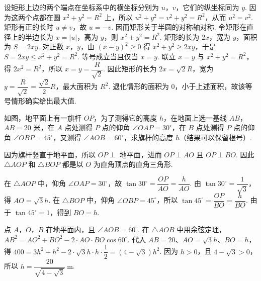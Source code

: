 \begin{solution}
设矩形上边的两个端点在坐标系中的横坐标分别为 \(u\)，\(v\)，它们的纵坐标同为 \(y\). 因为这两个点都在圆 \(x^2+y^2=R^2\) 上，所以 \(u^2+y^2=v^2+y^2=R^2\)，从而 \(u^2=v^2\). 矩形有正的长时 \(u\ne v\)，故 \(u=-v\). 因而矩形关于半圆的对称轴对称. 令矩形在直径上的半边长为 \(x=|u|\)，高为 \(y\)，则 \(x^2+y^2=R^2\). 矩形的长为 \(2x\)，宽为 \(y\)，面积为 \(S=2xy\). 对正数 \(x\)，\(y\)，由 \((x-y)^2\geq0\) 得 \(x^2+y^2\geq2xy\)，于是 \(S=2xy\leq x^2+y^2=R^2\). 等号成立当且仅当 \(x=y\). 联立 \(x=y\) 与 \(x^2+y^2=R^2\)，得 \(2x^2=R^2\)，所以 \(x=y=\dfrac{R}{\sqrt2}\). 因此矩形的长为 \(2x=\sqrt2R\)，宽为 \(y=\dfrac{R}{\sqrt2}=\dfrac{\sqrt2}{2}R\)，最大面积为 \(R^2\). 退化情形的面积为 \(0\)，小于上述面积，故该等号情形确实给出最大值.
\end{solution}

\begin{problem}
如图，地平面上有一旗杆 \(OP\)，为了测得它的高度 \(h\)，在地面上选一基线 \(AB\)，\(AB=20\text{ 米}\)，在 \(A\) 点处测得 \(P\) 点的仰角 \(\angle OAP=30^{\circ}\)，在 \(B\) 点处测得 \(P\) 点的仰角 \(\angle OBP=45^{\circ}\)，又测得 \(\angle AOB=60^{\circ}\)，求旗杆的高度 \(h\)（结果可以保留根号）.

\begin{center}
\end{center}
\end{problem}

\begin{solution}
因为旗杆竖直于地平面，所以 \(OP\perp\) 地平面，进而 \(OP\perp AO\) 且 \(OP\perp BO\). 因此 \(\triangle AOP\) 和 \(\triangle BOP\) 都是以 \(O\) 为直角顶点的直角三角形.

在 \(\triangle AOP\) 中，仰角 \(\angle OAP=30^{\circ}\)，故 \(\tan30^{\circ}=\dfrac{OP}{AO}=\dfrac{h}{AO}\). 由 \(\tan30^{\circ}=\dfrac1{\sqrt3}\)，得 \(AO=\sqrt3h\). 在 \(\triangle BOP\) 中，仰角 \(\angle OBP=45^{\circ}\)，所以 \(\tan45^{\circ}=\dfrac{OP}{BO}=\dfrac{h}{BO}\). 由于 \(\tan45^{\circ}=1\)，得到 \(BO=h\).

点 \(A\)，\(O\)，\(B\) 在地平面内，且 \(\angle AOB=60^{\circ}\). 在 \(\triangle AOB\) 中用余弦定理，\(AB^2=AO^2+BO^2-2\cdot AO\cdot BO\cos60^{\circ}\). 代入 \(AB=20\)、\(AO=\sqrt3h\)、\(BO=h\)，得 \(400=3h^2+h^2-2\cdot\sqrt3h\cdot h\cdot\dfrac12=(4-\sqrt3)h^2\). 因为 \(h>0\)，且 \(4-\sqrt3>0\)，所以 \(h=\dfrac{20}{\sqrt{4-\sqrt3}}\mathrm{~m}\).
\end{solution}

